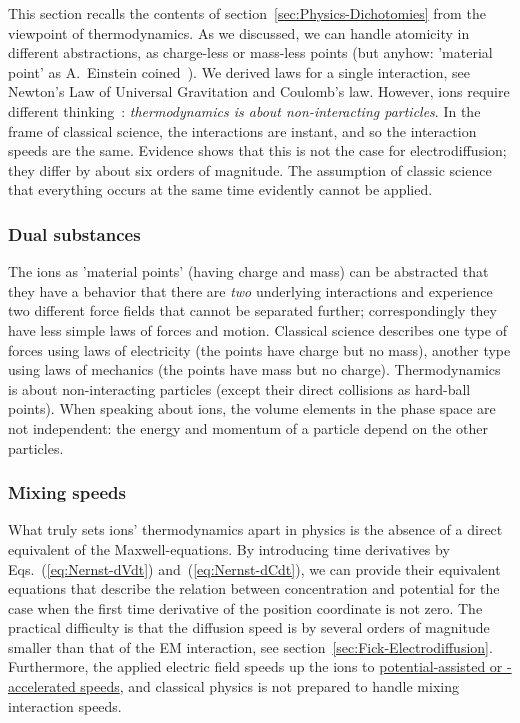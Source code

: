 This section recalls the contents of section~\ref{sec:Physics-Dichotomies} from the viewpoint of thermodynamics.
As we discussed, we can handle \hypertarget{ThermodynamicsSpecialties}{atomicity in different abstractions},
as charge-less or mass-less points (but anyhow: 'material point' as A.~Einstein coined~\cite{EinsteinSpecial:1905}). We derived laws for a single interaction,
see Newton's Law of Universal Gravitation and Coulomb's law.
However, ions require different thinking~\cite{VeghNon-ordinaryLaws:2025}: \textit{thermodynamics is about non-interacting particles}.
In the frame of classical science, the interactions are instant,
and so the interaction speeds are the same. Evidence shows that
this is not the case for electrodiffusion; they differ by about six orders of magnitude. The assumption of classic science that 
everything occurs at the same time evidently cannot be applied.%


\subsubsection[Dual substances]{Dual substances\label{sec:Physics-ThermodynamicsDual}}

The ions as 'material points' (having charge and mass) can be abstracted
that they have a behavior that there are \textit{two} underlying interactions and experience two different force fields that cannot be separated further;
correspondingly they have less simple laws of forces and motion.
Classical science describes one type of forces using laws of electricity (the points have charge but no mass),
another type using laws of mechanics (the points have mass but no charge).
Thermodynamics is about non-interacting particles (except their direct collisions as hard-ball points). When speaking about ions, the volume elements in the phase space are not independent: the energy and momentum of a particle depend on the other particles.

\subsubsection[Mixing speeds]{Mixing speeds\label{sec:Physics-ThermodynamicsMixingSpeeds}}

What truly sets ions' thermodynamics apart in physics is the absence of a direct
equivalent of the Maxwell-equations. 
By introducing time derivatives by Eqs.~(\ref{eq:Nernst-dVdt}) and~(\ref{eq:Nernst-dCdt}), we can provide their equivalent equations that describe the relation between concentration
and potential for the case when the first time derivative of the position coordinate is not zero.
The practical difficulty is that the diffusion speed is by several orders of magnitude smaller than that of the 
\gls{EM}
interaction, see section~\ref{sec:Fick-Electrodiffusion}.
Furthermore, the applied electric field speeds up the ions
to \hyperlink{MixingSpeeds}{potential-assisted or -accelerated speeds}, and 
classical physics is not prepared to handle mixing interaction speeds.


